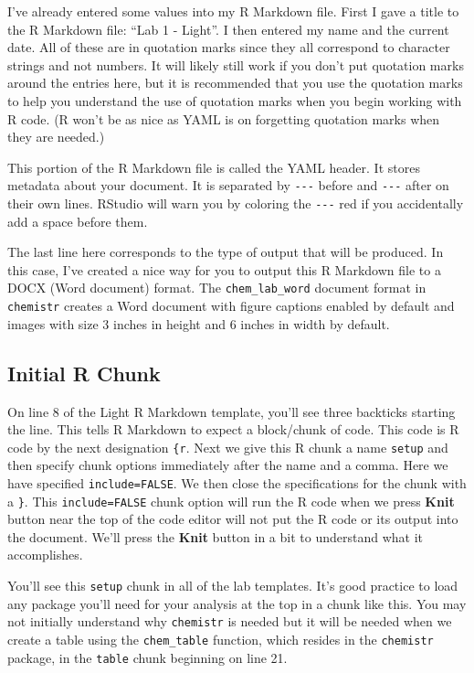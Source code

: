 \documentclass[]{tufte-book}
\begin{document}
I've already entered some values into my R Markdown file. First I gave a
title to the R Markdown file: ``Lab 1 - Light''. I then entered my name
and the current date. All of these are in quotation marks since they all
correspond to character strings and not numbers. It will likely still
work if you don't put quotation marks around the entries here, but it is
recommended that you use the quotation marks to help you understand the
use of quotation marks when you begin working with R code. (R won't be
as nice as YAML is on forgetting quotation marks when they are needed.)

This portion of the R Markdown file is called the YAML header. It stores
metadata about your document. It is separated by \texttt{-\/-\/-} before
and \texttt{-\/-\/-} after on their own lines. RStudio will warn you by
coloring the \texttt{-\/-\/-} red if you accidentally add a space before
them.

The last line here corresponds to the type of output that will be
produced. In this case, I've created a nice way for you to output this R
Markdown file to a DOCX (Word document) format. The
\texttt{chem\_lab\_word} document format in \texttt{chemistr} creates a
Word document with figure captions enabled by default and images with
size 3 inches in height and 6 inches in width by default.

\subsection{Initial R Chunk}\label{initial-r-chunk}

On line 8 of the Light R Markdown template, you'll see three backticks
starting the line. This tells R Markdown to expect a block/chunk of
code. This code is R code by the next designation \texttt{\{r}. Next we
give this R chunk a name \texttt{setup} and then specify chunk options
immediately after the name and a comma. Here we have specified
\texttt{include=FALSE}. We then close the specifications for the chunk
with a \texttt{\}}. This \texttt{include=FALSE} chunk option will run
the R code when we press \textbf{Knit} button near the top of the code
editor will not put the R code or its output into the document. We'll
press the \textbf{Knit} button in a bit to understand what it
accomplishes.

You'll see this \texttt{setup} chunk in all of the lab templates. It's
good practice to load any package you'll need for your analysis at the
top in a chunk like this. You may not initially understand why
\texttt{chemistr} is needed but it will be needed when we create a table
using the \texttt{chem\_table} function, which resides in the
\texttt{chemistr} package, in the \texttt{table} chunk beginning on line
21.
\end{document}
